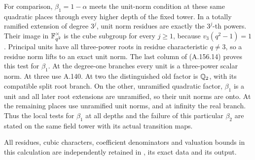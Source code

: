 For comparison, \(\beta_1=1-\alpha\) meets the unit-norm condition
at these same quadratic places through every higher depth of the
fixed tower.  In a totally ramified extension of degree \(3^j\),
unit norm residues are exactly the \(3^j\)-th powers.
Their image in \(\mathbb F_{q^2}^\times\) is the cube subgroup for every
\(j\geq1\), because \(v_3(q^2-1)=1\).
Principal units have all three-power roots in residue characteristic
\(q\ne3\), so a residue norm lifts to an exact unit norm.
The last column of (A.156.14) proves this test for \(\beta_1\).
At the degree-one branches every unit is a three-power scalar norm.
At three use A.140.  At two the distinguished old factor is
\(\mathbb Q_2\), with its compatible split root branch.  On the other,
unramified quadratic factor, \(\beta_1\) is a unit and all later
root extensions are unramified, so their unit norms are onto.
At the remaining places use unramified unit norms, and at infinity the
real branch.  Thus the local tests for \(\beta_1\) at all depths
and the failure of this particular \(\beta_2\) are stated on the
same field tower with its actual transition maps.

All residues, cubic characters, coefficient denominators and valuation
bounds in this calculation are independently retained in
,
its exact data and its output.
